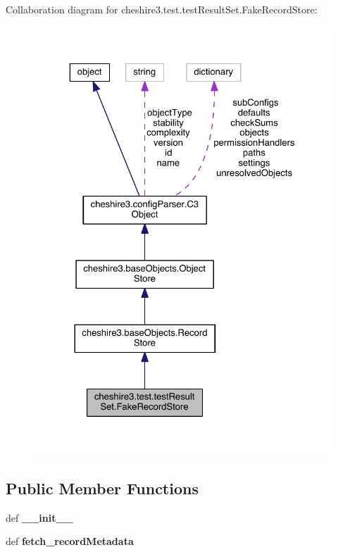 Collaboration diagram for cheshire3.\-test.\-test\-Result\-Set.\-Fake\-Record\-Store\-:
\nopagebreak
\begin{figure}[H]
\begin{center}
\leavevmode
\includegraphics[width=325pt]{classcheshire3_1_1test_1_1test_result_set_1_1_fake_record_store__coll__graph}
\end{center}
\end{figure}
\subsection*{Public Member Functions}
\begin{DoxyCompactItemize}
\item 
\hypertarget{classcheshire3_1_1test_1_1test_result_set_1_1_fake_record_store_aad44ad2958691b32f23a1e2ec62001b1}{def {\bfseries \-\_\-\-\_\-init\-\_\-\-\_\-}}\label{classcheshire3_1_1test_1_1test_result_set_1_1_fake_record_store_aad44ad2958691b32f23a1e2ec62001b1}

\item 
\hypertarget{classcheshire3_1_1test_1_1test_result_set_1_1_fake_record_store_ac8299253b759aaae0111e129615a1004}{def {\bfseries fetch\-\_\-record\-Metadata}}\label{classcheshire3_1_1test_1_1test_result_set_1_1_fake_record_store_ac8299253b759aaae0111e129615a1004}

\end{DoxyCompactItemize}
